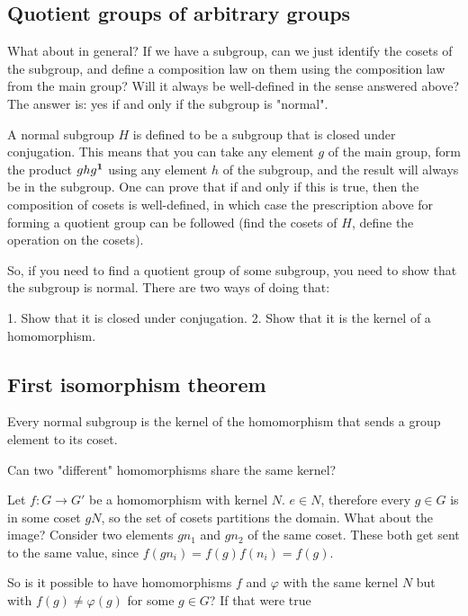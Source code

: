 \subsection{Quotient groups of arbitrary groups}

What about in general? If we have a subgroup, can we just identify the cosets
of the subgroup, and define a composition law on them using the composition law
from the main group? Will it always be well-defined in the sense answered
above? The answer is: yes if and only if the subgroup is "normal".

A normal subgroup $H$ is defined to be a subgroup that is closed under
conjugation. This means that you can take any element $g$ of the main group,
form the product $ghg^{\mathbf 1}$ using any element $h$ of the subgroup, and the result
will always be in the subgroup. One can prove that if and only if this is true,
then the composition of cosets is well-defined, in which case the prescription
above for forming a quotient group can be followed (find the cosets of $H$,
define the operation on the cosets).

So, if you need to find a quotient group of some subgroup, you need to show
that the subgroup is normal. There are two ways of doing that:

1. Show that it is closed under conjugation.
2. Show that it is the kernel of a homomorphism.



\subsection{First isomorphism theorem}


Every normal subgroup is the kernel of the homomorphism that sends a group element to its coset.

Can two "different" homomorphisms share the same kernel?

Let $f: G \rightarrow G'$ be a homomorphism with kernel $N$. $e \in N$,
therefore every $g \in G$ is in some coset $gN$, so the set of cosets
partitions the domain. What about the image? Consider two elements $gn_1$ and
$gn_2$ of the same coset. These both get sent to the same value, since
$f(gn_i) = f(g)f(n_i) = f(g)$.

So is it possible to have homomorphisms $f$ and $\varphi$ with the same kernel
$N$ but with $f(g) \neq \varphi(g)$ for some $g \in G$? If that were true
